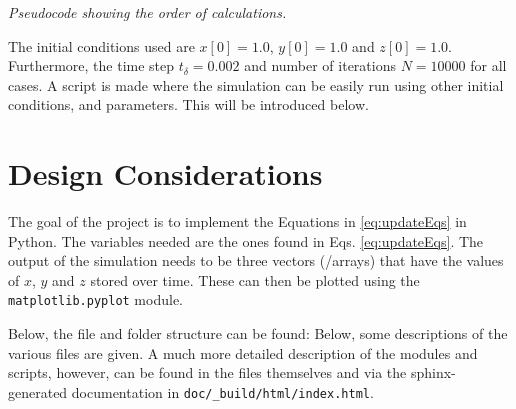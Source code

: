 \documentclass{article}
\def\td{t_\delta}
\def\code#1{\texttt{#1}}
\begin{document}
\begin{algorithm}[ht]
    \vspace{0.12cm}
    \caption{\it Pseudocode showing the order of calculations.\label{alg:calcOrder}}
\end{algorithm}

The initial conditions used are $x[0] = 1.0$, $y[0] = 1.0$ and $z[0] = 1.0$. Furthermore, the time step $\td = 0.002$ and number of iterations $N = 10000$ for all cases. A script is made where the simulation can be easily run using other initial conditions, and parameters. This will be introduced below.

\section{Design Considerations}
The goal of the project is to implement the Equations in \eqref{eq:updateEqs} in Python. The variables needed are the ones found in Eqs. \eqref{eq:updateEqs}. The output of the simulation needs to be three vectors (/arrays) that have the values of $x$, $y$ and $z$ stored over time. These can then be plotted using the \code{matplotlib.pyplot} module.

Below, the file and folder structure can be found:
\pagebreak
{}
\vspace{2em}
\noindent 
Below, some descriptions of the various files are given. A much more detailed description of the modules and scripts, however, can be found in the files themselves and via the sphinx-generated documentation in \code{doc/\_build/html/index.html}.
\end{document}
